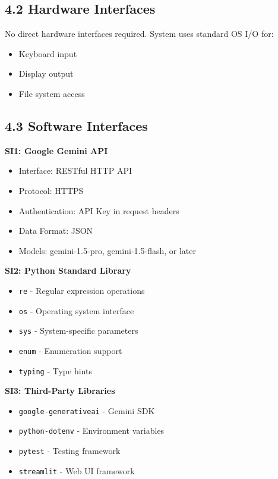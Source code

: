 \documentclass[a4paper,11pt]{article}
\begin{document}
\subsection{4.2 Hardware Interfaces}

No direct hardware interfaces required. System uses standard OS I/O for:
\begin{itemize}
    \item Keyboard input
    \item Display output
    \item File system access
\end{itemize}

\subsection{4.3 Software Interfaces}

\textbf{SI1: Google Gemini API}
\begin{itemize}
    \item Interface: RESTful HTTP API
    \item Protocol: HTTPS
    \item Authentication: API Key in request headers
    \item Data Format: JSON
    \item Models: gemini-1.5-pro, gemini-1.5-flash, or later
\end{itemize}

\textbf{SI2: Python Standard Library}
\begin{itemize}
    \item \texttt{re} - Regular expression operations
    \item \texttt{os} - Operating system interface
    \item \texttt{sys} - System-specific parameters
    \item \texttt{enum} - Enumeration support
    \item \texttt{typing} - Type hints
\end{itemize}

\textbf{SI3: Third-Party Libraries}
\begin{itemize}
    \item \texttt{google-generativeai} - Gemini SDK
    \item \texttt{python-dotenv} - Environment variables
    \item \texttt{pytest} - Testing framework
    \item \texttt{streamlit} - Web UI framework
\end{itemize}
\end{document}
